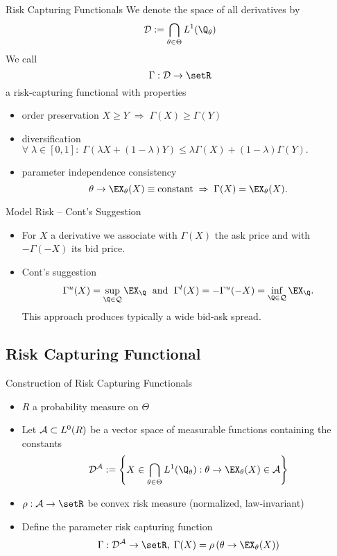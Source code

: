 {Risk Capturing Functionals}
We denote the space of all derivatives by
\begin{equation}
{\cal D} := \bigcap_{\theta \in \Theta} L^1(\Q_\theta)
\end{equation}
We call
$$
\Gamma: {\cal D} \rightarrow \setR
$$
a risk-capturing functional with properties
\begin{itemize}
\item<1-> order preservation $X \geq Y \; \Rightarrow \; \Gamma(X) \geq \Gamma(Y)$
\item<2-> diversification $\forall \; \lambda \in [0,1]: \; \Gamma(\lambda X + (1-\lambda) Y) \leq \lambda \Gamma(X) + (1-\lambda) \Gamma(Y).$
\item<3-> parameter independence consistency
$$
\theta \rightarrow \EX_\theta(X) \equiv \mbox{constant} \; \Rightarrow \; \Gamma(X) = \EX_\theta(X).
$$
\end{itemize}


{Model Risk -- Cont's Suggestion}
\begin{itemize}
\item<1-> For $X$ a derivative we associate with
$\Gamma(X)$ the ask price and with $-\Gamma(-X)$ its bid price.
\item<2-> Cont's suggestion
$$
\Gamma^u(X)=\sup_{\Q \in {\cal Q}} \EX_{\Q} \; \mbox{ and } \;
\Gamma^l(X)= -\Gamma^u(-X)=\inf_{\Q \in {\cal Q}} \EX_{\Q}.
$$
This approach produces typically a wide bid-ask spread.
\end{itemize}


\subsection{Risk Capturing Functional}


{Construction of Risk Capturing Functionals}
\begin{itemize}
\item<1-> $R$ a probability measure on $\Theta$
\item<1-> Let ${\cal A} \subset L^0(R)$ be a vector space of measurable functions containing the constants
\begin{equation}
{\cal D^A} := \left\{ X \in \bigcap_{\theta \in \Theta}  L^1(\Q_\theta): \theta \rightarrow \EX_\theta(X) \in {\cal A} \right\}
\end{equation}
\item<1-> $\rho: {\cal A} \rightarrow \setR$ be convex risk measure (normalized, law-invariant)
\item<2->

Define the parameter risk capturing function
\begin{equation}
\Gamma: {\cal D^A} \rightarrow \setR, \; \Gamma(X) = \rho\left(\theta \rightarrow \EX_\theta(X)\right)
\end{equation}
\end{itemize}



